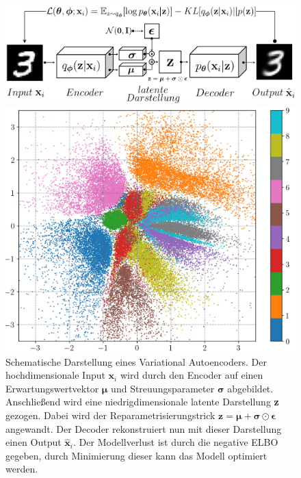 \documentclass[12pt]{article}
\begin{document}
	\begin{figure}[h!]
		\centering
		\includegraphics[scale=0.41]{VAE-Modell}
		\captionsetup{labelformat=empty}
		\caption{Schematische Darstellung eines Variational Autoencoders. Der hochdimensionale Input $\mathbf{x}_i$ wird durch den Encoder auf einen Erwartungswertvektor $\boldsymbol{\mu}$ und Streuungsparameter $\boldsymbol{\sigma}$ abgebildet. Anschließend wird eine niedrigdimensionale latente Darstellung \textbf{z} gezogen. Dabei wird der Reparametrisierungstrick $\textbf{z}=\boldsymbol{\mu}+\boldsymbol{\sigma} \odot \boldsymbol{\epsilon}$ angewandt. Der Decoder rekonstruiert nun mit dieser Darstellung einen Output $\hat{\mathbf{x}}_i$. Der Modellverlust ist durch die negative ELBO gegeben, durch Minimierung dieser kann das Modell optimiert werden.\\}
		\centering
		\begin{minipage}{.5\textwidth}
			\centering
			\includegraphics[scale=0.43]{latent_space_2D}
		\end{minipage}%
		\begin{minipage}{.5\textwidth}

\end{minipage}
\end{figure}
\end{document}

